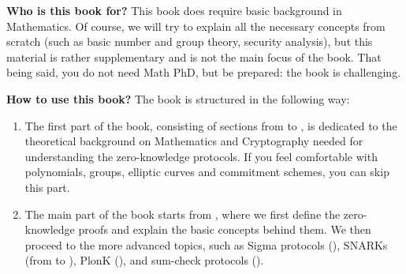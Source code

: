 \documentclass[../../book]{subfiles}
\begin{document}
\textbf{Who is this book for?} This book does require basic background in
Mathematics. Of course, we will try to explain all the necessary concepts from
scratch (such as basic number and group theory, security analysis), but this
material is rather supplementary and is not the main focus of the book. That
being said, you do not need Math PhD, but be prepared: the book is challenging.

\textbf{How to use this book?} The book is structured in the following way:
\begin{enumerate}
    \item The first part of the book, consisting of sections from
     to , is dedicated to
    the theoretical background on Mathematics and Cryptography needed for
    understanding the zero-knowledge protocols. If you feel comfortable with
    polynomials, groups, elliptic curves and commitment schemes, you can skip
    this part.
    \item The main part of the book starts from , where 
    we first define the zero-knowledge proofs and explain the basic concepts
    behind them. We then proceed to the more advanced topics, such as Sigma
    protocols (), SNARKs (from 
    to ), PlonK (), and sum-check protocols ().
\end{enumerate}
\end{document}
